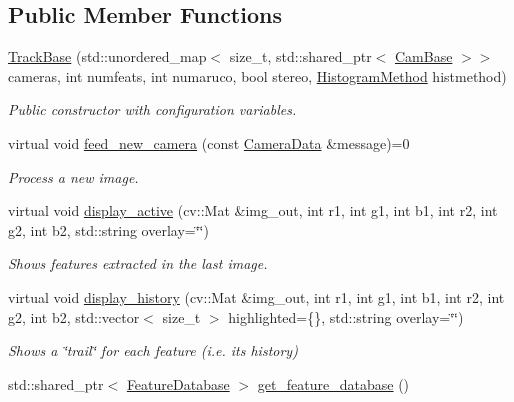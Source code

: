 \subsection*{Public Member Functions}
\begin{DoxyCompactItemize}
\item 
\hyperlink{classov__core_1_1TrackBase_a645127d6e03e66b96959ececccb3ffc0}{Track\+Base} (std\+::unordered\+\_\+map$<$ size\+\_\+t, std\+::shared\+\_\+ptr$<$ \hyperlink{classov__core_1_1CamBase}{Cam\+Base} $>$$>$ cameras, int numfeats, int numaruco, bool stereo, \hyperlink{classov__core_1_1TrackBase_aa4b34a5dce99b59522d57bf9278c9a1a}{Histogram\+Method} histmethod)
\begin{DoxyCompactList}\small\item\em Public constructor with configuration variables. \end{DoxyCompactList}\item 
virtual void \hyperlink{classov__core_1_1TrackBase_a18f208f4047e9a1955406806ba68a8c1}{feed\+\_\+new\+\_\+camera} (const \hyperlink{structov__core_1_1CameraData}{Camera\+Data} \&message)=0
\begin{DoxyCompactList}\small\item\em Process a new image. \end{DoxyCompactList}\item 
virtual void \hyperlink{classov__core_1_1TrackBase_a01c002a52290030fb86955ed6706f658}{display\+\_\+active} (cv\+::\+Mat \&img\+\_\+out, int r1, int g1, int b1, int r2, int g2, int b2, std\+::string overlay=\char`\"{}\char`\"{})
\begin{DoxyCompactList}\small\item\em Shows features extracted in the last image. \end{DoxyCompactList}\item 
virtual void \hyperlink{classov__core_1_1TrackBase_ae90a40ff97cf87e1fe58e278d49c2f5b}{display\+\_\+history} (cv\+::\+Mat \&img\+\_\+out, int r1, int g1, int b1, int r2, int g2, int b2, std\+::vector$<$ size\+\_\+t $>$ highlighted=\{\}, std\+::string overlay=\char`\"{}\char`\"{})
\begin{DoxyCompactList}\small\item\em Shows a \char`\"{}trail\char`\"{} for each feature (i.\+e. its history) \end{DoxyCompactList}\item 
std\+::shared\+\_\+ptr$<$ \hyperlink{classov__core_1_1FeatureDatabase}{Feature\+Database} $>$ \hyperlink{classov__core_1_1TrackBase_aebcef580e2c1639d45bcb74e2bc516aa}{get\+\_\+feature\+\_\+database} ()
$$
\end{DoxyCompactItemize}
